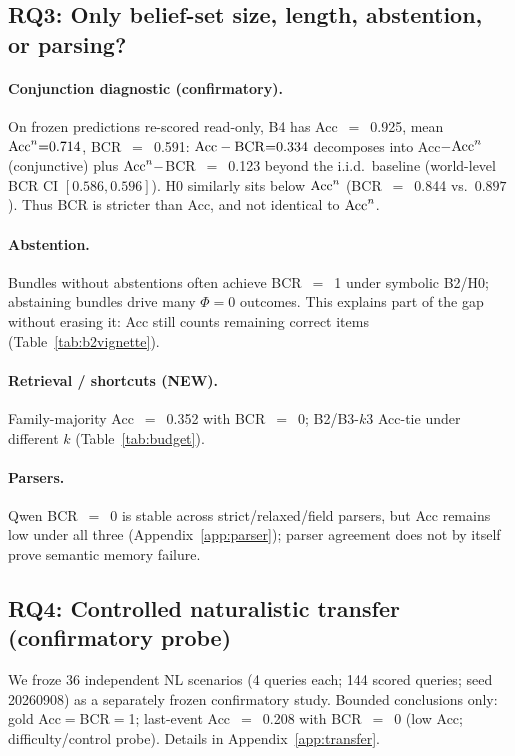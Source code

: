 \subsection{RQ3: Only belief-set size, length, abstention, or parsing?}
\label{sec:robustness}

\paragraph{Conjunction diagnostic (confirmatory).}
On frozen predictions re-scored read-only, B4 has Acc~$=$~0.925, mean $\mathrm{Acc}^{n}{=}0.714$, BCR~$=$~0.591: $\mathrm{Acc}-\mathrm{BCR}{=}0.334$ decomposes into Acc$-\mathrm{Acc}^{n}$ (conjunctive) plus $\mathrm{Acc}^{n}-$BCR~$=$~0.123 beyond the i.i.d.\ baseline (world-level BCR CI $[0.586,0.596]$). H0 similarly sits below $\mathrm{Acc}^{n}$ (BCR~$=$~0.844 vs.\ $0.897$). Thus BCR is stricter than Acc, and not identical to $\mathrm{Acc}^{n}$.

\paragraph{Abstention.} Bundles without abstentions often achieve BCR~$=$~1 under symbolic B2/H0; abstaining bundles drive many $\Phi{=}0$ outcomes. This explains part of the gap without erasing it: Acc still counts remaining correct items (Table~\ref{tab:b2vignette}).

\paragraph{Retrieval / shortcuts (NEW).} Family-majority Acc~$=$~0.352 with BCR~$=$~0; B2/B3-$k3$ Acc-tie under different $k$ (Table~\ref{tab:budget}).

\paragraph{Parsers.} Qwen BCR~$=$~0 is stable across strict/relaxed/field parsers, but Acc remains low under all three (Appendix~\ref{app:parser}); parser agreement does not by itself prove semantic memory failure.

\subsection{RQ4: Controlled naturalistic transfer (confirmatory probe)}

We froze 36 independent NL scenarios (4 queries each; 144 scored queries; seed 20260908) as a separately frozen confirmatory study. Bounded conclusions only: gold Acc$=$BCR$=$1; last-event Acc~$=$~0.208 with BCR~$=$~0 (low Acc; difficulty/control probe). Details in Appendix~\ref{app:transfer}.

